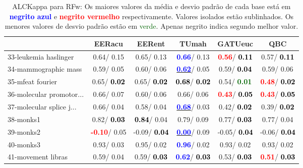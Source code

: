 \begin{table}[h]
\caption{ALCKappa para RFw: Os maiores valores da média e desvio padrão de cada base está em \textcolor{blue}{\textbf{negrito azul}} e \textcolor{red}{\textbf{negrito vermelho}} respectivamente. Valores isolados estão sublinhados. Os menores valores de desvio padrão estão em \textcolor{darkgreen}{verde}. Apenas negrito indica segundo melhor valor.}
\begin{center}\begin{tabular}{lc|c|c|c|c}
 & EERacu & EERent & TUmah & \textbf{GATUeuc} & QBC\\ \hline 33-leukemia haslinger &   0.64/  0.15 &   0.65/  0.13 & \textcolor{blue}{\textbf{  0.66}}/  0.13 & \textcolor{red}{\textbf{  0.56}}/\textcolor{black}{\textbf{  0.11}} &   0.57/\textcolor{black}{\textbf{  0.11}} \\
34-mammographic mass &   0.59/  0.05 &   0.60/  0.06 & \underline{\textcolor{blue}{\textbf{  0.62}}}/  0.05 &   0.59/\textcolor{black}{\textbf{  0.04}} &   0.59/  0.06 \\
35-mfeat fourier &   0.65/\textcolor{black}{\textbf{  0.02}} &   0.65/\textcolor{black}{\textbf{  0.02}} & \textcolor{black}{\textbf{  0.68}}/\textcolor{black}{\textbf{  0.02}} &   0.54/\textcolor{darkgreen}{\textbf{  0.01}} & \textcolor{red}{\textbf{  0.48}}/\textcolor{black}{\textbf{  0.02}} \\
36-molecular promotor... &   0.66/  0.07 &   0.60/  0.06 &   0.66/  0.06 & \textcolor{red}{\textbf{  0.43}}/\textcolor{black}{\textbf{  0.05}} & \textcolor{red}{\textbf{  0.43}}/\textcolor{black}{\textbf{  0.05}} \\
37-molecular splice j... &   0.66/  0.04 &   0.58/  0.04 & \underline{\textcolor{blue}{\textbf{  0.68}}}/  0.03 &   0.42/\textcolor{black}{\textbf{  0.02}} &   0.39/\textcolor{black}{\textbf{  0.02}} \\
38-monks1 &   0.82/\textcolor{black}{\textbf{  0.03}} & \textcolor{black}{\textbf{  0.84}}/  0.04 &   0.79/  0.09 &   0.77/\textcolor{black}{\textbf{  0.03}} &   0.77/  0.04 \\
39-monks2 & \textcolor{red}{\textbf{ -0.10}}/  0.05 &  -0.09/\textcolor{black}{\textbf{  0.04}} & \underline{\textcolor{blue}{\textbf{  0.00}}}/  0.09 &  -0.05/\textcolor{black}{\textbf{  0.04}} &  -0.06/\textcolor{black}{\textbf{  0.04}} \\ \hline
40-monks3 &   0.93/  0.03 &   0.95/  0.02 & \textcolor{blue}{\textbf{  0.96}}/  0.02 &   0.93/  0.02 &   0.93/  0.02 \\
41-movement libras &   0.59/  0.04 &   0.59/\textcolor{black}{\textbf{  0.03}} & \textcolor{blue}{\textbf{  0.62}}/\textcolor{black}{\textbf{  0.03}} &   0.53/\textcolor{black}{\textbf{  0.03}} & \textcolor{red}{\textbf{  0.51}}/\textcolor{black}{\textbf{  0.03}} \\

\end{tabular}
\end{center}
\end{table}
